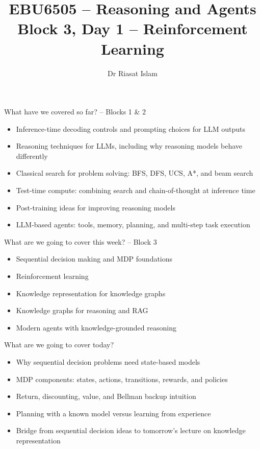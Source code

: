 \documentclass[aspectratio=169]{beamer}
\title[EBU6505 Block 3 Day 1]{EBU6505 -- Reasoning and Agents\\Block 3, Day 1 -- Reinforcement Learning}
\author{Dr Riasat Islam}
\institute{Queen Mary University of London}
\date{}
\newcommand{\defaultdeckrefs}{AIMA4e Ch.22 pp.789--822; Poole3e Ch.13 pp.583--608}
\newcommand{\currentsliderefs}{\defaultdeckrefs}
\newcommand{\setslideref}[1]{\gdef\currentsliderefs{#1}}
\begin{document}
\setslideref{AIMA4e Ch.22 pp.789--822; Poole3e Ch.13 pp.583--608}
\begin{frame}
  \titlepage
\end{frame}

\setslideref{AIMA4e Ch.22 pp.789--822; Poole3e Ch.13 pp.583--608}
\begin{frame}{What have we covered so far? -- Blocks 1 \& 2}
\begin{itemize}
  \item Inference-time decoding controls and prompting choices for LLM outputs
  \item Reasoning techniques for LLMs, including why reasoning models behave differently
  \item Classical search for problem solving: BFS, DFS, UCS, A*, and beam search
  \item Test-time compute: combining search and chain-of-thought at inference time
  \item Post-training ideas for improving reasoning models
  \item LLM-based agents: tools, memory, planning, and multi-step task execution
\end{itemize}
\end{frame}

\setslideref{AIMA4e Ch.17 -- Making Complex Decisions; Poole3e Ch.12 -- Planning with Uncertainty}
\begin{frame}{What are we going to cover this week? -- Block 3}
\begin{itemize}
  \item Sequential decision making and MDP foundations
  \item Reinforcement learning
  \item Knowledge representation for knowledge graphs
  \item Knowledge graphs for reasoning and RAG
  \item Modern agents with knowledge-grounded reasoning
\end{itemize}
\end{frame}

\setslideref{AIMA4e Ch.17 -- Making Complex Decisions; Poole3e Ch.12 -- Planning with Uncertainty}
\begin{frame}{What are we going to cover today?}
\begin{itemize}
  \item Why sequential decision problems need state-based models
  \item MDP components: states, actions, transitions, rewards, and policies
  \item Return, discounting, value, and Bellman backup intuition
  \item Planning with a known model versus learning from experience
  \item Bridge from sequential decision ideas to tomorrow's lecture on knowledge representation
\end{itemize}
\end{frame}
\end{document}
